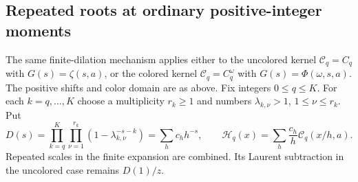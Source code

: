 \subsection{Repeated roots at ordinary positive-integer moments}

The same finite-dilation mechanism applies either to the uncolored
kernel $\mathcal C_q=C_q$ with $G(s)=\zeta(s,a)$, or the colored
kernel $\mathcal C_q=C_q^\omega$ with $G(s)=\Phi(\omega,s,a)$.
The positive shifts and color domain are as above. Fix integers
$0\le q\le K$. For each $k=q,\ldots,K$ choose a multiplicity
$r_k\ge1$ and numbers $\lambda_{k,\nu}>1$, $1\le\nu\le r_k$.
Put
\begin{equation}\label{stconf:product}
 D(s)=\prod_{k=q}^K\prod_{\nu=1}^{r_k}
                  (1-\lambda_{k,\nu}^{-s-k})
        =\sum_h c_hh^{-s},\qquad
 \mathcal H_q(x)=\sum_h\frac{c_h}{h}\mathcal C_q(x/h,a).
\end{equation}
Repeated scales in the finite expansion are combined. Its Laurent
subtraction in the uncolored case remains $D(1)/z$.

